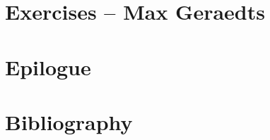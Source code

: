 \documentclass[twoside, openany, 12pt, a5paper]{book}
\begin{document}
\chapter{Exercises -- {\small Max Geraedts}} 
\backmatter

\chapter{Epilogue}

\chapter{Bibliography}



\end{document}
